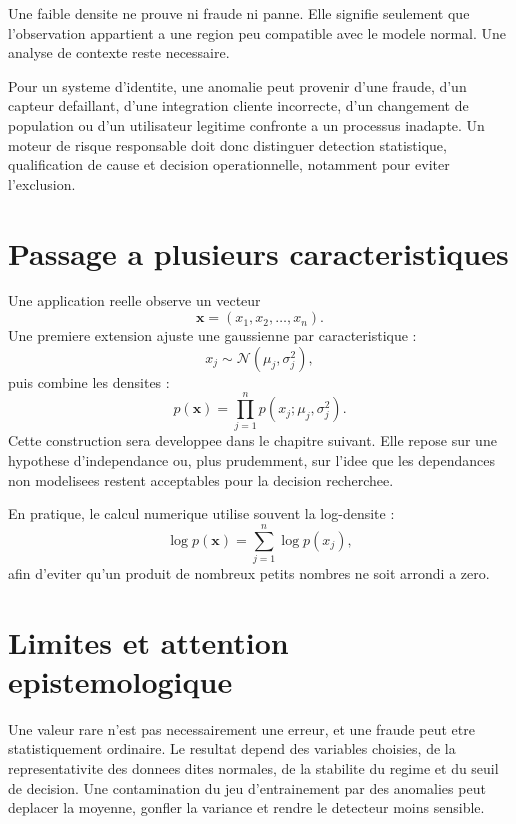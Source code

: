 Une faible densite ne prouve ni fraude ni panne. Elle signifie seulement que
l'observation appartient a une region peu compatible avec le modele normal.
Une analyse de contexte reste necessaire.

\begin{engineeringbox}
Pour un systeme d'identite, une anomalie peut provenir d'une fraude, d'un capteur
defaillant, d'une integration cliente incorrecte, d'un changement de population
ou d'un utilisateur legitime confronte a un processus inadapte. Un moteur de
risque responsable doit donc distinguer detection statistique, qualification de
cause et decision operationnelle, notamment pour eviter l'exclusion.
\end{engineeringbox}

\section{Passage a plusieurs caracteristiques}

Une application reelle observe un vecteur
\begin{equation}
\mathbf x=(x_1,x_2,\ldots,x_n).
\end{equation}
Une premiere extension ajuste une gaussienne par caracteristique :
\begin{equation}
x_j\sim\mathcal N(\mu_j,\sigma_j^2),
\end{equation}
puis combine les densites :
\begin{equation}
p(\mathbf x)=\prod_{j=1}^{n}p(x_j;\mu_j,\sigma_j^2).
\end{equation}
Cette construction sera developpee dans le chapitre suivant. Elle repose sur
une hypothese d'independance ou, plus prudemment, sur l'idee que les dependances
non modelisees restent acceptables pour la decision recherchee.

En pratique, le calcul numerique utilise souvent la log-densite :
\begin{equation}
\log p(\mathbf x)=\sum_{j=1}^{n}\log p(x_j),
\end{equation}
afin d'eviter qu'un produit de nombreux petits nombres ne soit arrondi a zero.

\section{Limites et attention epistemologique}

\begin{attentionbox}
Une valeur rare n'est pas necessairement une erreur, et une fraude peut etre
statistiquement ordinaire. Le resultat depend des variables choisies, de la
representativite des donnees dites normales, de la stabilite du regime et du
seuil de decision. Une contamination du jeu d'entrainement par des anomalies
peut deplacer la moyenne, gonfler la variance et rendre le detecteur moins
sensible.
\end{attentionbox}

